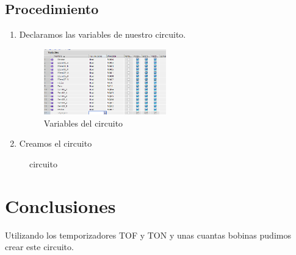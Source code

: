 \documentclass[12pt]{report}
\begin{document}
\section{Procedimiento}
\begin{enumerate}
  \item Declaramos las variables de nuestro circuito.
    \begin{figure}[H]
      \centering
      \includegraphics[width=0.5\textwidth]{screenshots/Variables.png}
      \caption{Variables del circuito}
      \label{fig:variables}
    \end{figure}
  \item Creamos el circuito


\end{enumerate}

\newpage
\begin{figure}[H]
  \centering
  \caption{circuito}
  \label{fig:pdfimage}
\end{figure}
\newpage

\chapter{Conclusiones}
  Utilizando los temporizadores TOF y TON y unas cuantas bobinas pudimos crear este circuito.
\newpage
\end{document}
